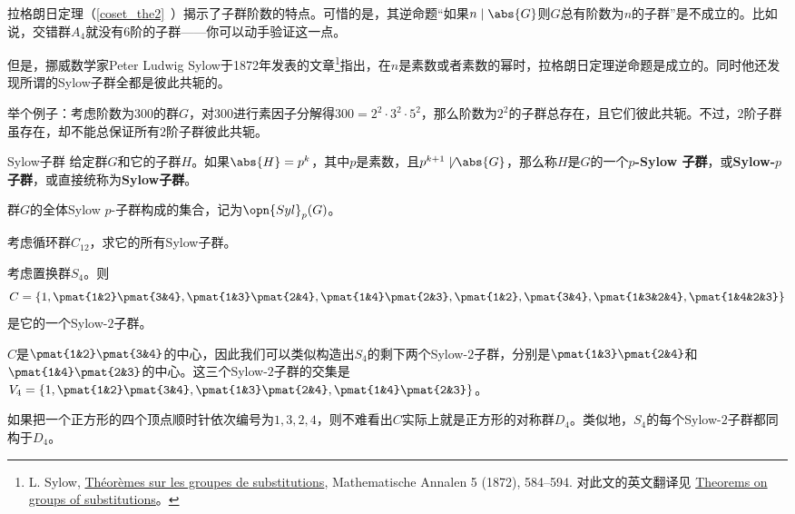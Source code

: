 



拉格朗日定理（\autoref{coset_the2}~）揭示了子群阶数的特点。可惜的是，其逆命题“如果$n\mid \abs{G}$则$G$总有阶数为$n$的子群”是不成立的。比如说，交错群$A_4$就没有$6$阶的子群——你可以动手验证这一点。

但是，挪威数学家Peter Ludwig Sylow于1872年发表的文章\footnote{L. Sylow, \href{https://eudml.org/doc/156588}{Théorèmes sur les groupes de substitutions}, Mathematische Annalen 5 (1872), 584–594. 对此文的英文翻译见 \href{http://www.maths.qmul.ac.uk/~raw/pubs_files/Sylow.pdf}{Theorems on groups of substitutions}。}指出，在$n$是素数或者素数的幂时，拉格朗日定理逆命题是成立的。同时他还发现所谓的Sylow子群全都是彼此共轭的。

举个例子：考虑阶数为$300$的群$G$，对$300$进行素因子分解得$300=2^2\cdot 3^2\cdot 5^2$，那么阶数为$2^2$的子群总存在，且它们彼此共轭。不过，$2$阶子群虽存在，却不能总保证所有$2$阶子群彼此共轭。


\begin{definition}{Sylow子群}\label{Sylow_def1}
给定群$G$和它的子群$H$。如果$\abs{H}=p^k$，其中$p$是素数，且$p^{k+1}\not\mid\abs{G}$，那么称$H$是$G$的一个$p$\textbf{-Sylow 子群}，或\textbf{Sylow-}$p$\textbf{子群}，或直接统称为\textbf{Sylow子群}。

群$G$的全体Sylow $p$-子群构成的集合，记为$\opn{Syl}_p(G)$。
\end{definition}



\begin{exercise}{}
考虑循环群$C_{12}$，求它的所有Sylow子群。
\end{exercise}

\begin{example}{}
考虑置换群$S_4$。则
\begin{equation}
C=\{1, \pmat{1&2}\pmat{3&4}, \pmat{1&3}\pmat{2&4}, \pmat{1&4}\pmat{2&3}, \pmat{1&2}, \pmat{3&4}, \pmat{1&3&2&4}, \pmat{1&4&2&3}\}
\end{equation}
是它的一个Sylow-$2$子群。

$C$是$\pmat{1&2}\pmat{3&4}$的中心，因此我们可以类似构造出$S_4$的剩下两个Sylow-$2$子群，分别是$\pmat{1&3}\pmat{2&4}$和$\pmat{1&4}\pmat{2&3}$的中心。这三个Sylow-$2$子群的交集是$V_4=\{1, \pmat{1&2}\pmat{3&4}, \pmat{1&3}\pmat{2&4}, \pmat{1&4}\pmat{2&3}\}$。

如果把一个正方形的四个顶点顺时针依次编号为$1, 3, 2, 4$，则不难看出$C$实际上就是正方形的对称群$D_4$。类似地，$S_4$的每个Sylow-$2$子群都同构于$D_4$。

\end{example}

